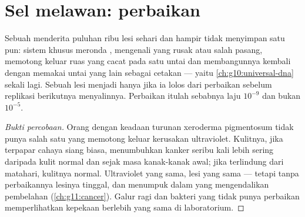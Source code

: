 \section{Sel melawan: perbaikan}

\begin{proposition}\label{prop:g11:mutations:repair}
Sebuah  menderita puluhan ribu lesi  sehari dan hampir tidak
menyimpan satu pun: sistem  khusus meronda ,
mengenali  yang rusak atau salah pasang, memotong keluar ruas yang
cacat pada satu untai dan membangunnya kembali dengan memakai untai
yang lain sebagai cetakan --- yaitu 
\cref{ch:g10:universal-dna} sekali lagi. Sebuah lesi menjadi 
hanya jika ia lolos dari perbaikan sebelum replikasi berikutnya
menyalinnya. Perbaikan itulah sebabnya laju  $10^{-9}$ dan
bukan $10^{-5}$.
\end{proposition}
\begin{proof}[Bukti percobaan]
Orang dengan keadaan turunan xeroderma pigmentosum tidak punya salah
satu  yang memotong keluar kerusakan ultraviolet. Kulitnya, jika
terpapar cahaya siang biasa, menumbuhkan kanker seribu kali lebih
sering daripada kulit normal dan sejak masa kanak-kanak awal; jika
terlindung dari matahari, kulitnya normal. Ultraviolet yang sama, lesi
yang sama --- tetapi tanpa perbaikannya lesinya tinggal, dan 
menumpuk dalam  yang mengendalikan pembelahan 
(\cref{ch:g11:cancer}). Galur ragi dan bakteri yang tidak punya 
perbaikan memperlihatkan kepekaan berlebih yang sama di laboratorium.
\end{proof}


